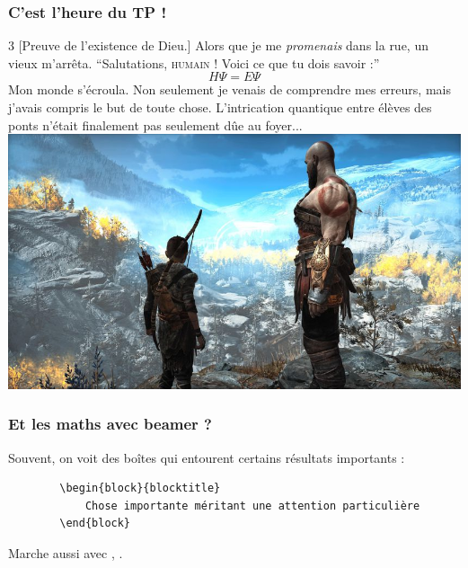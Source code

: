 \documentclass[handout]{beamer}
\begin{document}
\begin{frame}
	\frametitle{C'est l'heure du TP !}

	\begin{multicols}{3}
	[Preuve de l'existence de Dieu.]
	Alors que je me \textit{promenais} dans la rue, un vieux m'arrêta. ``Salutations, \textsc{humain} ! Voici ce que tu dois savoir :''\\
	\begin{equation*}
		H\Psi = E\Psi
	\end{equation*}
	Mon monde s'écroula. Non seulement je venais de comprendre mes erreurs, mais j'avais compris le but de toute chose. L'intrication quantique entre élèves des ponts n'était finalement pas seulement dûe au foyer...\\

	\includegraphics[scale=0.1]{Images/Beamer/dieu.jpg}

	\end{multicols}

\end{frame}

\begin{frame}[fragile=singleslide]
	\frametitle{Et les maths avec beamer ?}

	Souvent, on voit des boîtes qui entourent certains résultats importants :
	\begin{verbatim}
		\begin{block}{blocktitle}
			Chose importante méritant une attention particulière
		\end{block}
	\end{verbatim}

	Marche aussi avec \textit{\color{red}{alertblock}}, \textit{\color{green}{exampleblock}}.
\end{frame}
\end{document}
